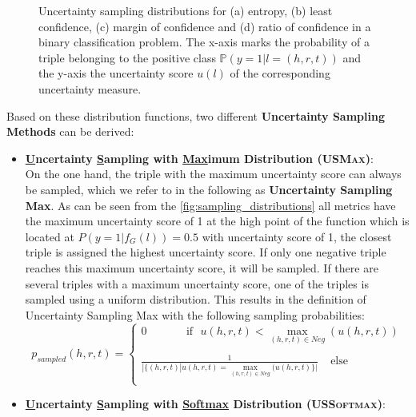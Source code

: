 \begin{figure}
\begin{minipage}{.5\textwidth}
    \end{minipage}%
    \caption{Uncertainty sampling distributions for (a) entropy, (b) least confidence, (c) margin of confidence and (d) ratio of confidence in a binary classification problem.
    The x-axis marks the probability of a triple belonging to the positive class $\mathbb{P}(y = 1 | l = (h,r,t))$ and the y-axis the uncertainty score $u(l)$ of the corresponding uncertainty measure.}
    \label{fig:sampling_distributions}
\end{figure}

Based on these distribution functions, two different \textbf{Uncertainty Sampling Methods} can be derived:
\begin{itemize}
    \item 
    \textbf{\underline{U}ncertainty \underline{S}ampling with \underline{Max}imum Distribution (\textsc{USMax})}:\\
    On the one hand, the triple with the maximum uncertainty score can always be sampled, which we refer to in the following as \textbf{Uncertainty Sampling Max}.
    As can be seen from the \autoref{fig:sampling_distributions} all metrics have the maximum uncertainty score of 1 at the high point of the function which is located at $P(y = 1 | f_G(l)) = 0.5$ with uncertainty score of 1, the closest triple is assigned the highest uncertainty score.
    If only one negative triple reaches this maximum uncertainty score, it will be sampled.
    If there are several triples with a maximum uncertainty score, one of the triples is sampled using a uniform distribution.
    This results in the definition of Uncertainty Sampling Max with the following sampling probabilities:
    \begin{equation} 
        p_{sampled}(h, r, t)=
        \begin{cases}
             0 \ \ \ \ \ \  \ \ \ \ \ \ \ \  \ \ 
             \text{if}\ \ \ u(h, r, t) < \max_{(h,r,t) \in Neg}(u(h, r, t)) 
             \\ \\
            \frac{1}{|\{(h,r,t) | u(h,r,t) = \max_{(h,r,t) \in Neg}(u(h, r, t)\}|} 
            \ \ \ \ \
            \text{else} 
             \\
        \end{cases}
         \label{eq:uncertainty_max}
    \end{equation}
    
    
    \item
    \textbf{\underline{U}ncertainty \underline{S}ampling with \underline{Softmax} Distribution (\textsc{USSoftmax})}:\\
    

\end{itemize}
